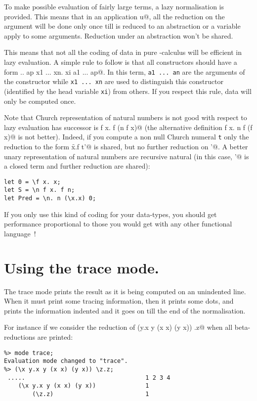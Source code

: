 {{To make possible evaluation of fairly large terms, a lazy normalisation is
provided. This means that in an application \verb@t u@, all the reduction on
the argument \verb@u@ will be done only once till \verb@u@ is reduced to an
abstraction or a variable apply to some arguments. Reduction under an
abstraction won't be shared. 

This means that not all the coding of data in pure \TLambda-calculus will be
efficient in lazy evaluation. A simple rule to follow is that all constructors
should have a form \verb@{} .. ap x1 ... xn. xi a1 ... ap@. In this term,
{\tt a1 ... an} are the arguments of the constructor while {\tt x1 ... xn} are
used to distinguish this constructor (identified by the head variable {\tt xi})
from others.  If you respect this rule, data will only be computed once.

Note that Church representation of natural numbers is not good with respect to
lazy evaluation has successor is \verb@\n f x. f (n f x)@ (the alternative
definition \verb@\n f x. n f (f x)@ is not better). Indeed, if you compute a
non null Church numeral {\tt t} only the reduction to the form \verb@\f x.f
t'@ is shared, but no further reduction on \verb@t'@. A better unary
representation of natural numbers are recursive natural (in this case,
\verb@t'@ is a closed term and further reduction are shared):
\begin{verbatim}
let 0 = \f x. x;
let S = \n f x. f n;
let Pred = \n. n (\x.x) 0;
\end{verbatim}

If you only use this kind of coding for your data-types, you should get
performance proportional to those you would get with any other functional
language~!

\section{Using the trace mode.}

The trace mode prints the result as it is being computed on an unindented
line. When it must print some tracing information, then it prints some dots,
and prints the information indented and it goes on till the end of the
normalisation. 

For instance if we consider the reduction of \verb@(\x y.x y (x x) (y x))
\z.z@ when all beta-reductions are printed:
\begin{verbatim}
%> mode trace;
Evaluation mode changed to "trace".
%> (\x y.x y (x x) (y x)) \z.z;
 .....                                  1 2 3 4
    (\x y.x y (x x) (y x))              1
        (\z.z)                          1


\end{verbatim}}}
